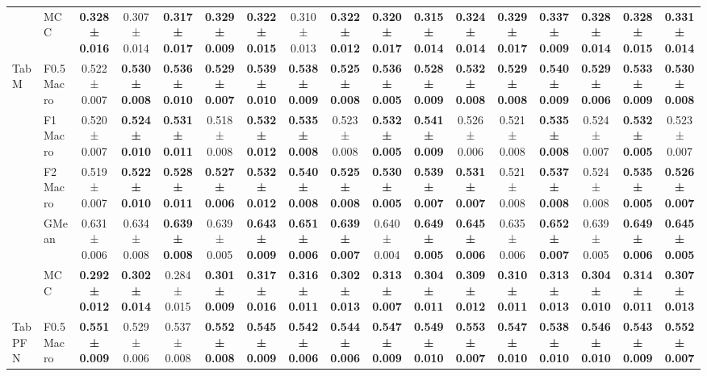 \begin{table}[H]
{\begin{tabular}{llccccccccccccccc}
 & MCC & \textbf{0.328 ± 0.016} & 0.307 ± 0.014 & \textbf{0.317 ± 0.017} & \textbf{0.329 ± 0.009} & \textbf{0.322 ± 0.015} & 0.310 ± 0.013 & \textbf{0.322 ± 0.012} & \textbf{0.320 ± 0.017} & \textbf{0.315 ± 0.014} & \textbf{0.324 ± 0.014} & \textbf{0.329 ± 0.017} & \textbf{0.337 ± 0.009} & \textbf{0.328 ± 0.014} & \textbf{0.328 ± 0.015} & \textbf{0.331 ± 0.014} \\
\cline{1-17}
\multirow[t]{5}{*}{TabM} & F0.5 Macro & 0.522 ± 0.007 & \textbf{0.530 ± 0.008} & \textbf{0.536 ± 0.010} & \textbf{0.529 ± 0.007} & \textbf{0.539 ± 0.010} & \textbf{0.538 ± 0.009} & \textbf{0.525 ± 0.008} & \textbf{0.536 ± 0.005} & \textbf{0.528 ± 0.009} & \textbf{0.532 ± 0.008} & \textbf{0.529 ± 0.008} & \textbf{0.540 ± 0.009} & \textbf{0.529 ± 0.006} & \textbf{0.533 ± 0.009} & \textbf{0.530 ± 0.008} \\
 & F1 Macro & 0.520 ± 0.007 & \textbf{0.524 ± 0.010} & \textbf{0.531 ± 0.011} & 0.518 ± 0.008 & \textbf{0.532 ± 0.012} & \textbf{0.535 ± 0.008} & 0.523 ± 0.008 & \textbf{0.532 ± 0.005} & \textbf{0.541 ± 0.009} & 0.526 ± 0.006 & 0.521 ± 0.008 & \textbf{0.535 ± 0.008} & 0.524 ± 0.007 & \textbf{0.532 ± 0.005} & 0.523 ± 0.007 \\
 & F2 Macro & 0.519 ± 0.007 & \textbf{0.522 ± 0.010} & \textbf{0.528 ± 0.011} & \textbf{0.527 ± 0.006} & \textbf{0.532 ± 0.012} & \textbf{0.540 ± 0.008} & \textbf{0.525 ± 0.008} & \textbf{0.530 ± 0.005} & \textbf{0.539 ± 0.007} & \textbf{0.531 ± 0.007} & 0.521 ± 0.008 & \textbf{0.537 ± 0.008} & 0.524 ± 0.008 & \textbf{0.535 ± 0.005} & \textbf{0.526 ± 0.007} \\
 & GMean & 0.631 ± 0.006 & 0.634 ± 0.008 & \textbf{0.639 ± 0.008} & 0.639 ± 0.005 & \textbf{0.643 ± 0.009} & \textbf{0.651 ± 0.006} & \textbf{0.639 ± 0.007} & 0.640 ± 0.004 & \textbf{0.649 ± 0.005} & \textbf{0.645 ± 0.006} & 0.635 ± 0.006 & \textbf{0.652 ± 0.007} & 0.639 ± 0.005 & \textbf{0.649 ± 0.006} & \textbf{0.645 ± 0.005} \\
 & MCC & \textbf{0.292 ± 0.012} & \textbf{0.302 ± 0.014} & 0.284 ± 0.015 & \textbf{0.301 ± 0.009} & \textbf{0.317 ± 0.016} & \textbf{0.316 ± 0.011} & \textbf{0.302 ± 0.013} & \textbf{0.313 ± 0.007} & \textbf{0.304 ± 0.011} & \textbf{0.309 ± 0.012} & \textbf{0.310 ± 0.011} & \textbf{0.313 ± 0.013} & \textbf{0.304 ± 0.010} & \textbf{0.314 ± 0.011} & \textbf{0.307 ± 0.013} \\
\cline{1-17}
\multirow[t]{5}{*}{TabPFN} & F0.5 Macro & \textbf{0.551 ± 0.009} & 0.529 ± 0.006 & 0.537 ± 0.008 & \textbf{0.552 ± 0.008} & \textbf{0.545 ± 0.009} & \textbf{0.542 ± 0.006} & \textbf{0.544 ± 0.006} & \textbf{0.547 ± 0.009} & \textbf{0.549 ± 0.010} & \textbf{0.553 ± 0.007} & \textbf{0.547 ± 0.010} & \textbf{0.538 ± 0.010} & \textbf{0.546 ± 0.010} & \textbf{0.543 ± 0.009} & \textbf{0.552 ± 0.007} \\

\end{tabular}}
\end{table}
